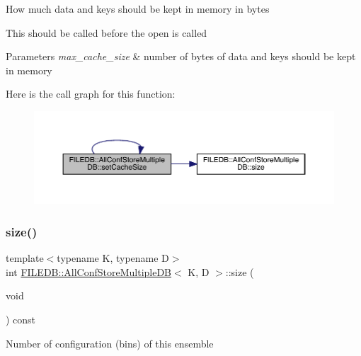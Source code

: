 How much data and keys should be kept in memory in bytes

This should be called before the open is called 
\begin{DoxyParams}{Parameters}
{\em max\+\_\+cache\+\_\+size} & number of bytes of data and keys should be kept in memory \\
\hline
\end{DoxyParams}
Here is the call graph for this function\+:
\nopagebreak
\begin{figure}[H]
\begin{center}
\leavevmode
\includegraphics[width=350pt]{d5/dbe/classFILEDB_1_1AllConfStoreMultipleDB_a746ef51b2dedf529a8e85528c0d31bfc_cgraph}
\end{center}
\end{figure}
\mbox{\label{classFILEDB_1_1AllConfStoreMultipleDB_af05105b1ffe17093556a209ac9db1ed9}} 
\subsubsection{\texorpdfstring{size()}{size()}\hspace{0.1cm}{\footnotesize\ttfamily [1/2]}}
{\footnotesize\ttfamily template$<$typename K, typename D$>$ \\
int \mbox{\hyperlink{classFILEDB_1_1AllConfStoreMultipleDB}{F\+I\+L\+E\+D\+B\+::\+All\+Conf\+Store\+Multiple\+DB}}$<$ K, D $>$\+::size (\begin{DoxyParamCaption}\item[{void}]{ }\end{DoxyParamCaption}) const\hspace{0.3cm}{\ttfamily [inline]}}

Number of configuration (bins) of this ensemble \mbox{\label{classFILEDB_1_1AllConfStoreMultipleDB_af05105b1ffe17093556a209ac9db1ed9}} 
